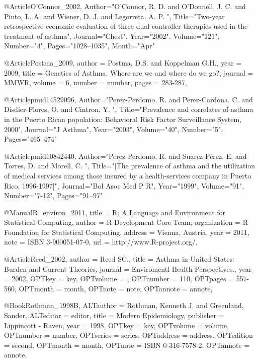 {{{%

@Article{O'Connor_2002,
   Author="O'Connor, R. D.  and O'Donnell, J. C.  and Pinto, L. A.  and Wiener, D. J.  and Legorreta, A. P. ",
   Title="{{T}wo-year retrospective economic evaluation of three dual-controller therapies used in the treatment of asthma}",
   Journal="Chest",
   Year="2002",
   Volume="121",
   Number="4",
   Pages="1028--1035",
   Month="Apr"
}


@Article{Postma_2009,
  author = {Postma, D.S. and Koppelman G.H.},
  year = {2009},
  title = {Genetics of Asthma. Where are we and where do we go?},
  journal = MMWR,
  volume =  {6},
  number = {number},
  pages = {283-287},
}


@Article{pmid14529096,
   Author="Perez-Perdomo, R.  and Perez-Cardona, C.  and Disdier-Flores, O.  and Cintron, Y. ",
   Title="{{P}revalence and correlates of asthma in the {P}uerto {R}ican population: {B}ehavioral {R}isk {F}actor {S}urveillance {S}ystem, 2000}",
   Journal="J Asthma",
   Year="2003",
   Volume="40",
   Number="5",
   Pages="465--474"
}

@Article{pmid10842440,
   Author="Perez-Perdomo, R.  and Suarez-Perez, E.  and Torres, D.  and Morell, C. ",
   Title="{[{T}he prevalence of asthma and the utilization of medical services among those insured by a health-services company in {P}uerto {R}ico, 1996-1997]}",
   Journal="Bol Asoc Med P R",
   Year="1999",
   Volume="91",
   Number="7-12",
   Pages="91--97"
}




@Manual{R_environ_2011,
    title = {R: A Language and Environment for Statistical Computing},
    author = {{R Development Core Team}},
    organization = {R Foundation for Statistical Computing},
    address = {Vienna, Austria},
    year = {2011},
    note = {{ISBN} 3-900051-07-0},
    url = {http://www.R-project.org/},
  }

@Article{Reed_2002,
author = {Reed SC.},
title = {Asthma in United States: Burden and Current Theories},
journal = {Enviromentl Health Perspectives.},
year = {2002},
OPTkey = {key},
OPTvolume = {},
OPTnumber = {110},
OPTpages = {557-560},
OPTmonth = {month},
OPTnote = {note},
OPTannote = {annote},
}


@Book{Rothman_1998B,
ALTauthor = {Rothman, Kenneth J. and Greenland, Sander},
ALTeditor = {editor},
title = {Modern Epidemiology},
publisher = {Lippincott - Raven},
year = {1998},
OPTkey = {key},
OPTvolume = {volume},
OPTnumber = {number},
OPTseries = {series},
OPTaddress = {address},
OPTedition = {second},
OPTmonth = {month},
OPTnote = {{ISBN} 0-316-7578-2},
OPTannote = {annote},
}


}}}
